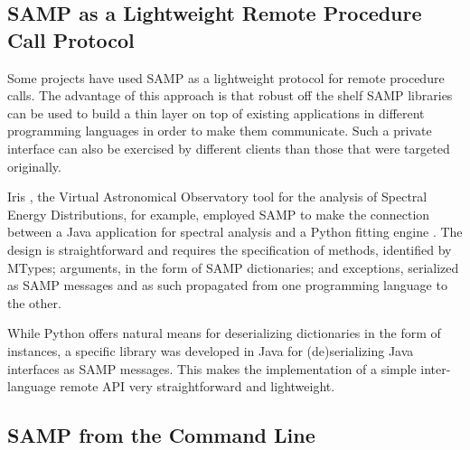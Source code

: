 \subsection{SAMP as a Lightweight Remote Procedure Call Protocol}

Some projects have used SAMP as a lightweight protocol for remote procedure calls. The advantage of this approach is that robust off the shelf SAMP libraries can be used to build a thin layer on top of existing applications in different programming languages in order to make them communicate. Such a private interface can also be exercised by different clients than those that were targeted originally.

Iris \citep{2012ASPC..461..893D}, the Virtual Astronomical Observatory tool for the analysis of Spectral Energy Distributions, for example, employed SAMP to make the connection between a Java application for spectral analysis \citep[Specview, by STScI,][]{2000ASPC..216...79B} and a Python fitting engine \citep[Sherpa, by SAO,][]{2007ASPC..376..543D}. The design is straightforward and requires the specification of methods, identified by MTypes; arguments, in the form of SAMP dictionaries; and exceptions, serialized as SAMP messages and as such propagated from one programming language to the other.

While Python offers natural means for deserializing dictionaries in the form of instances, a specific library was developed in Java for (de)serializing Java interfaces as SAMP messages. This makes the implementation of a simple inter-language remote API very straightforward and lightweight.

\subsection{SAMP from the Command Line}

